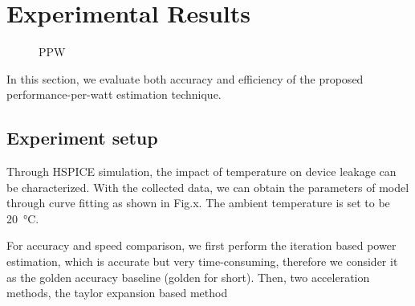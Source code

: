 \section{Experimental Results}
\begin{figure}[htb]
\centering
{}%
%
\caption{PPW}  
\label{fig:ppw}
\end{figure}
In this section, we evaluate both accuracy and efficiency of the proposed performance-per-watt estimation technique.

\subsection{Experiment setup}
Through HSPICE simulation, the impact of temperature on device leakage can be characterized. With the collected data, we can obtain the parameters of model through curve fitting as shown in Fig.x. The ambient temperature is set to be \SI{20}{\degreeCelsius}.

For accuracy and speed comparison, we first perform the iteration based power estimation, which is accurate but very time-consuming, therefore we consider it as the golden accuracy baseline (golden for short). Then, two acceleration methods, the taylor expansion based method 